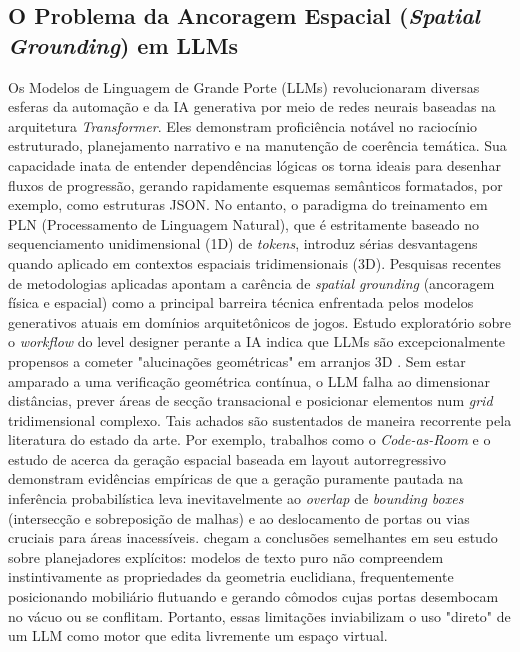 \subsection{O Problema da Ancoragem Espacial (\textit{Spatial Grounding}) em LLMs}
Os Modelos de Linguagem de Grande Porte (LLMs) revolucionaram diversas esferas da automação e da IA generativa por meio de redes neurais baseadas na arquitetura \textit{Transformer}. Eles demonstram proficiência notável no raciocínio estruturado, planejamento narrativo e na manutenção de coerência temática. Sua capacidade inata de entender dependências lógicas os torna ideais para desenhar fluxos de progressão, gerando rapidamente esquemas semânticos formatados, por exemplo, como estruturas JSON. No entanto, o paradigma do treinamento em PLN (Processamento de Linguagem Natural), que é estritamente baseado no sequenciamento unidimensional (1D) de \textit{tokens}, introduz sérias desvantagens quando aplicado em contextos espaciais tridimensionais (3D).
Pesquisas recentes de metodologias aplicadas apontam a carência de \textit{spatial grounding} (ancoragem física e espacial) como a principal barreira técnica enfrentada pelos modelos generativos atuais em domínios arquitetônicos de jogos. Estudo exploratório sobre o \textit{workflow} do level designer perante a IA indica que LLMs são excepcionalmente propensos a cometer "alucinações geométricas" em arranjos 3D \cite{re2026integration}. Sem estar amparado a uma verificação geométrica contínua, o LLM falha ao dimensionar distâncias, prever áreas de secção transacional e posicionar elementos num \textit{grid} tridimensional complexo.
Tais achados são sustentados de maneira recorrente pela literatura do estado da arte. Por exemplo, trabalhos como o \textit{Code-as-Room} \cite{yang2026codeasroomgenerating3drooms} e o estudo de \cite{feng2026repurposing3dgenerativemodel} acerca da geração espacial baseada em layout autorregressivo demonstram evidências empíricas de que a geração puramente pautada na inferência probabilística leva inevitavelmente ao \textit{overlap} de \textit{bounding boxes} (intersecção e sobreposição de malhas) e ao deslocamento de portas ou vias cruciais para áreas inacessíveis. \cite{sun2024roomplanner} chegam a conclusões semelhantes em seu estudo sobre planejadores explícitos: modelos de texto puro não compreendem instintivamente as propriedades da geometria euclidiana, frequentemente posicionando mobiliário flutuando e gerando cômodos cujas portas desembocam no vácuo ou se conflitam. Portanto, essas limitações inviabilizam o uso "direto" de um LLM como motor que edita livremente um espaço virtual.

